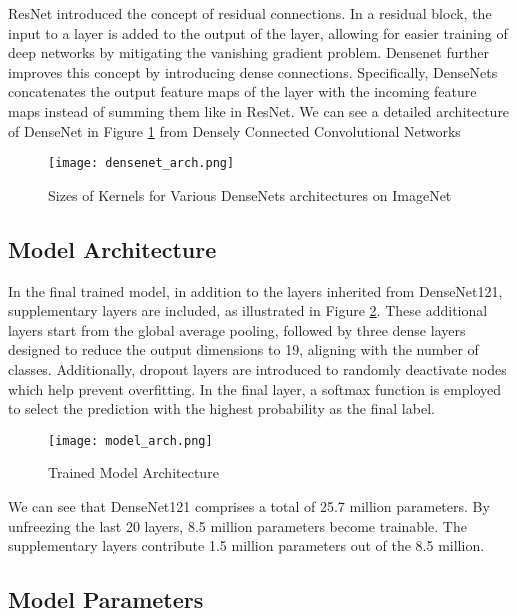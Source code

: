 \documentclass[11pt]{article}
\begin{document}
ResNet introduced the concept of residual connections. In a residual block, the input to a layer is added to the output of the layer, allowing for easier training of deep networks by mitigating the vanishing gradient problem. Densenet further improves this concept by introducing dense connections. Specifically, DenseNets concatenates the output feature maps of the layer with the incoming feature maps instead of summing them like in ResNet. We can see a detailed architecture of DenseNet in Figure \ref{fig:densenet_arch} from Densely Connected Convolutional Networks \cite{densenet_arc}

\begin{figure}[h]
\centering
\texttt{[image: densenet\_arch.png]}
\caption{\label{fig:densenet_arch}Sizes of Kernels for Various DenseNets \cite{densenet_arc} architectures on ImageNet}
\end{figure}

\pagebreak

\subsection{Model Architecture}

In the final trained model, in addition to the layers inherited from DenseNet121, supplementary layers are included, as illustrated in Figure \ref{fig:model_arch}. These additional layers start from the global average pooling, followed by three dense layers designed to reduce the output dimensions to 19, aligning with the number of classes. Additionally, dropout layers are introduced to randomly deactivate nodes which help prevent overfitting. In the final layer, a softmax function is employed to select the prediction with the highest probability as the final label.

\begin{figure}[h]
    \centering
    \texttt{[image: model\_arch.png]}
    \caption{\label{fig:model_arch}Trained Model Architecture}
\end{figure}

We can see that DenseNet121 comprises a total of 25.7 million parameters. By unfreezing the last 20 layers, 8.5 million parameters become trainable. The supplementary layers contribute 1.5 million parameters out of the 8.5 million.

\subsection{Model Parameters}
\end{document}
